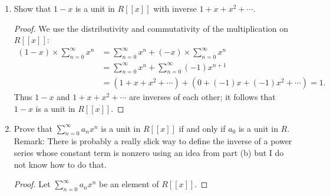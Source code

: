 \documentclass[11pt]{article}
\newcommand{\br}[1]{\left(#1\right)}
\begin{document}
\begin{enumerate}
\begin{enumerate}
\begin{proof}
\begin{align*}
            \end{align*} as desired, so that multiplication of formal power series is associative. 
            The multiplication is commutative: \[\sum_{n=0}^\infty a_nx^n\times \sum_{n=0}^\infty b_nx^n = \sum_{n=0}^\infty\br{\sum_{k=0}^n a_kb_{n-k}}x^n = \sum_{n=0}^\infty\br{\sum_{k=0}^n b_{n-k}a_k}x^n,\] and \[\sum_{k=0}^n b_{n-k}a_k = (b_na_0 + b_{n-1}a_1 + \cdots + b_1a_{n-1} + b_0a_n) = \sum_{i=0}^n b_ia_{n-i}\] so that \[\sum_{n=0}^\infty a_nx^n\times \sum_{n=0}^\infty b_nx^n = \sum_{n=0}^\infty\br{\sum_{k=0}^n b_{n-k}a_k}x^n = \sum_{n=0}^\infty\br{\sum_{i=0}^n b_ia_{n-i}}x^n = \sum_{n=0}^\infty b_nx^n\times \sum_{n=0}^\infty a_nx^n\] as desired. 
            With commutativity, we only need to check that multiplication distributes from one direction (e.g. from the right): \begin{align*}
                \br{\sum_{n=0}^\infty a_nx^n + \sum_{n=0}^\infty b_nx^n} \times \sum_{n=0}^\infty c_nx^n &= \sum_{n=0}^\infty (a_n+b_n)x^n\times \sum_{n=0}^\infty c_nx^n \\
                &= \sum_{n=0}^\infty\br{\sum_{k=0}^n(a_k+b_k)c_{n-k}}x^n\\
                &= \sum_{n=0}^\infty\br{\sum_{k=0}^na_kc_{n-k} + \sum_{k=0}^nb_kc_{n-k}}x^n\\
                &= \sum_{n=0}^\infty\br{\sum_{k=0}^na_kc_{n-k}}x^n + \sum_{n=0}^\infty\br{\sum_{k=0}^nb_kc_{n-k}}x^n\\
                &= \br{\sum_{n=0}^\infty a_nx^n\times \sum_{n=0}^\infty c_nx^n} + \br{\sum_{n=0}^\infty b_nx^n\times \sum_{n=0}^\infty c_nx^n}
            \end{align*}
            It follows that $R[[x]]$ is a commutative ring with $1$.
        \end{proof}
        \item Show that $1-x$ is a unit in $R[[x]]$ with inverse $1 + x + x^2 + \cdots$. \begin{proof}
            We use the distributivity and commutativity of the multiplication on $R[[x]]$: \begin{align*}
                (1-x)\times \sum_{n=0}^\infty x^n &= \sum_{n=0}^\infty x^n + (-x)\times \sum_{n=0}^\infty x^n\\
                &= \sum_{n=0}^\infty x^n + \sum_{n=0}^\infty (-1)x^{n+1}\\
                &= (1 + x + x^2 + \cdots) + (0 + (-1)x + (-1)x^2 + \cdots) = 1.
            \end{align*} Thus $1-x$ and $1 + x + x^2 + \cdots$ are inverses of each other; it follows that $1-x$ is a unit in $R[[x]]$.
        \end{proof}
        \item Prove that $\sum_{n=0}^\infty a_nx^n$ is a unit in $R[[x]]$ if and only if $a_0$ is a unit in $R$. Remark: There is probably a really slick way to define the inverse of a power series whose constant term is nonzero using an idea from part (b) but I do not know how to do that. \begin{proof}
            Let $\sum_{n=0}^\infty a_nx^n$ be an element of $R[[x]]$. 


\end{proof}
\end{enumerate}
\end{enumerate}
\end{document}
